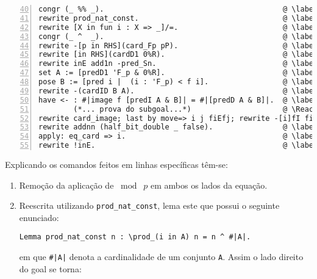 \begin{enumerate}[label=\textbf{\roman*.}]
\begin{enumerate}[label=\textbf{\roman{enumi}.(\alph*)}]
\begin{enumerate}[label=\textbf{(\alph{enumii}.\arabic*)}]
                                \begin{lstlisting}[language=coq,frame=single, numbers=left,stepnumber=1,tabsize=1, escapechar=@, name=proof, firstnumber=40]
congr (_ %% _).                                         @ \label{line:40-item4b-item2} @
rewrite prod_nat_const.                                 @ \label{line:41-item4b-item2} @
rewrite [X in fun i : X => _]/=.                        @ \label{line:42-item4b-item2} @
congr (_ ^  _).                                         @ \label{line:43-item4b-item2} @
rewrite -[p in RHS](card_Fp pP).                        @ \label{line:44-item4b-item2} @
rewrite [in RHS](cardD1 0%R).                           @ \label{line:45-item4b-item2} @
rewrite inE add1n -pred_Sn.                             @ \label{line:46-item4b-item2} @
set A := [predD1 'F_p & 0%R].                           @ \label{line:47-item4b-item2} @
pose B := [pred i |  (i : 'F_p) < f i].                 @ \label{line:48-item4b-item2} @
rewrite -(cardID B A).                                  @ \label{line:49-item4b-item2} @
have <- : #|image f [predI A & B]| = #|[predD A & B]|.  @ \label{line:50-item4b-item2} \Suppressnumber @
        (*... prova do subgoal...*)                     @ \Reactivatenumber \setcounter{lstnumber}{62} @
rewrite card_image; last by move=> i j fiEfj; rewrite -[i]fI fiEfj fI. @ \label{line:63-item4b-item2} @
rewrite addnn (half_bit_double _ false).                @ \label{line:64-item4b-item2} @
apply: eq_card => i.                                    @ \label{line:65-item4b-item2} @
rewrite !inE.                                           @ \label{line:66-item4b-item2} @
                                \end{lstlisting}
                        Explicando os comandos feitos em linhas específicas têm-se:

                        \begin{enumerate}[listparindent=\parindent]

                                \item[\textbf{(\ref{line:40-item4b-item2})}] Remoção da aplicação de $\bmod \; p$ em ambos os lados da equação.

                                \item[\textbf{(\ref{line:41-item4b-item2})}] Reescrita utilizando \lstinline[language=coq]|prod_nat_const|, lema este que possui o seguinte enunciado:
                                
                                        \begin{lstlisting}[language=coq,frame=single,tabsize=1]
Lemma prod_nat_const n : \prod_(i in A) n = n ^ #|A|.
                                        \end{lstlisting}
                                em que \lstinline[language=coq]!#|A|! denota a cardinalidade de um conjunto \lstinline[language=coq]!A!. Assim o lado direito do goal se torna:


\end{enumerate}
\end{enumerate}
\end{enumerate}
\end{enumerate}
